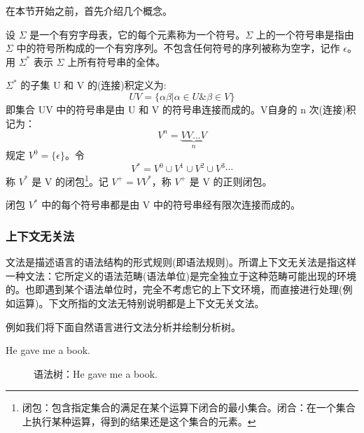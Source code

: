 在本节开始之前，首先介绍几个概念。

设 $\Sigma$ 是一个有穷字母表，它的每个元素称为一个符号。$\Sigma$ 上的一个符号串是指由 $\Sigma$ 中的符号所构成的一个有穷序列。不包含任何符号的序列被称为空字，记作 $\epsilon$。用 $\Sigma^*$ 表示 $\Sigma$ 上所有符号串的全体。

$\Sigma^*$ 的子集 U 和 V 的(连接)积定义为:
\[ UV = \{\alpha\beta | \alpha \in U \& \beta \in V\} \]
即集合 UV 中的符号串是由 U 和 V 的符号串连接而成的。V自身的 n 次(连接)积记为：
\[ V^n = \underbrace{VV...V}_{n} \]
规定 $V^0 = \{\epsilon\}$。令
\[ V^* = V^0 \cup V^1 \cup V^2 \cup V^3 \cdots \]
称 $V^{*}$ 是 V 的闭包\footnote{闭包：包含指定集合的满足在某个运算下闭合的最小集合。闭合：在一个集合上执行某种运算，得到的结果还是这个集合的元素。}。记 $V^+ = VV^*$，称 $V^+$ 是 V 的正则闭包。

闭包 $V^*$ 中的每个符号串都是由 V 中的符号串经有限次连接而成的。

\subsubsection{上下文无关法}

文法是描述语言的语法结构的形式规则(即语法规则)。所谓上下文无关法是指这样一种文法：它所定义的语法范畴(语法单位)是完全独立于这种范畴可能出现的环境的。也即遇到某个语法单位时，完全不考虑它的上下文环境，而直接进行处理(例如运算)。下文所指的文法无特别说明都是上下文无关文法。

例如我们将下面自然语言进行文法分析并绘制分析树。

\begin{center}
    He gave me a book.
\end{center}

\begin{figure}[H]
    \centering
    \caption{语法树：He gave me a book.}
    \label{语法树：He gave me a book.}
\end{figure}

